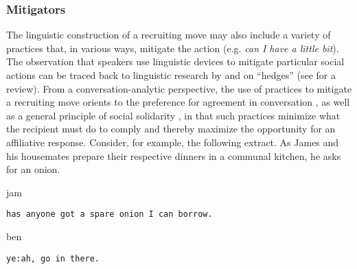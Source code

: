 \documentclass[output=paper,nonflat,modfont,draft]{langsci/langscibook}
\begin{document}
\subsubsection{Mitigators}
The linguistic construction of a recruiting move may also include a variety of practices that, in various ways, mitigate the action (e.g. \textit{can I have a little bit}). The observation that speakers use linguistic devices to mitigate particular social actions can be traced back to linguistic research by \citet{Lakoff1973} and \citet{BrownLevinson1987} on “hedges” (see \citealt{Schneider2010} for a review). From a conver\-sa\-tion-analytic perspective, the use of practices to mitigate a recruiting move orients to the preference for agreement in conversation \citep{Sacks1987}, as well as a general principle of social solidarity \citep{heritage_garfinkel_1984}, in that such practices minimize what the recipient must do to comply and thereby maximize the opportunity for an affiliative response. Consider, for example, the following extract. As James and his housemates prepare their respective dinners in a communal kitchen, he asks for an onion.


\begin{mdframedkendrick}[style=firstfoc]
\begin{transbox}{1}{jam}
\begin{verbatim}
has anyone got a spare onion I can borrow.
\end{verbatim}
\end{transbox}
\end{mdframedkendrick}\vspace{-5mm}



\begin{mdframedkendrick}[style=secondfoc]
\begin{transbox}{4}{ben}
\begin{verbatim}
ye:ah, go in there.
\end{verbatim}
\end{transbox}
\end{mdframedkendrick}
\end{document}

